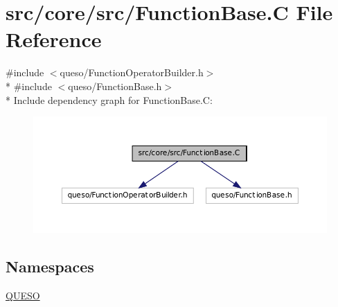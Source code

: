 \hypertarget{_function_base_8_c}{\section{src/core/src/\-Function\-Base.C File Reference}
\label{_function_base_8_c}
}
{\ttfamily \#include $<$queso/\-Function\-Operator\-Builder.\-h$>$}\\*
{\ttfamily \#include $<$queso/\-Function\-Base.\-h$>$}\\*
Include dependency graph for Function\-Base.\-C\-:
\nopagebreak
\begin{figure}[H]
\begin{center}
\leavevmode
\includegraphics[width=350pt]{_function_base_8_c__incl}
\end{center}
\end{figure}
\subsection*{Namespaces}
\begin{DoxyCompactItemize}
\item 
\hyperlink{namespace_q_u_e_s_o}{Q\-U\-E\-S\-O}
\end{DoxyCompactItemize}

